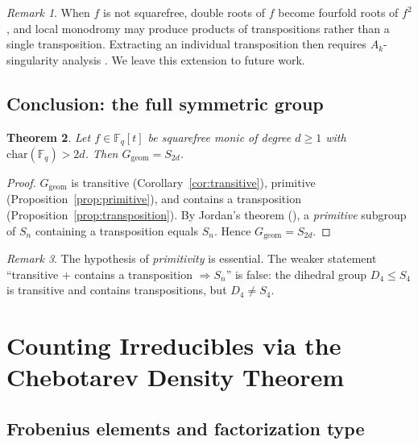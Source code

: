 \documentclass[11pt, a4paper]{article}
\newtheorem{theorem}{Theorem}[section]
\theoremstyle{definition}
\theoremstyle{remark}
\newtheorem{remark}[theorem]{Remark}
\newcommand{\Fq}{\mathbb{F}_q}
\begin{document}
\begin{remark}\label{rem:nonsqfree}
When $f$ is not squarefree, double roots of $f$ become
fourfold roots of $f^2$, and local monodromy may produce
products of transpositions rather than a single transposition.
Extracting an individual transposition then requires
$A_k$-singularity analysis \cite{AGLV1993}.
We leave this extension to future work.
\end{remark}

\subsection{Conclusion: the full symmetric group}

\begin{theorem}\label{thm:monodromy}
Let $f \in \Fq[t]$ be squarefree monic of degree $d \ge 1$ with
$\mathrm{char}(\Fq) > 2d$.
Then $G_{\mathrm{geom}} = S_{2d}$.
\end{theorem}

\begin{proof}
$G_{\mathrm{geom}}$ is transitive
(Corollary~\ref{cor:transitive}),
primitive (Proposition~\ref{prop:primitive}),
and contains a transposition
(Proposition~\ref{prop:transposition}).
By Jordan's theorem
(\cite[Thm.~3.3E]{dixon1996}),
a \emph{primitive} subgroup of $S_n$ containing a transposition
equals $S_n$.
Hence $G_{\mathrm{geom}} = S_{2d}$.
\end{proof}

\begin{remark}\label{rem:jordan}
The hypothesis of \emph{primitivity} is essential.
The weaker statement
``transitive + contains a transposition $\Rightarrow S_n$''
is false: the dihedral group $D_4 \le S_4$ is transitive
and contains transpositions, but $D_4 \ne S_4$.
\end{remark}

\section{Counting Irreducibles via the Chebotarev Density Theorem}
\label{sec:chebotarev}

\subsection{Frobenius elements and factorization type}
\end{document}
